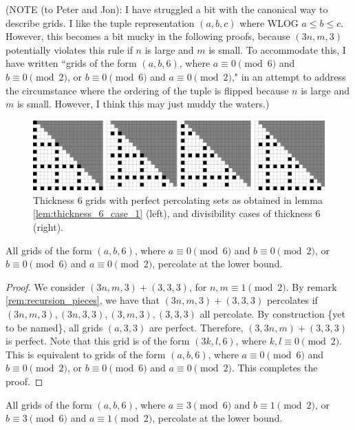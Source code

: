 (NOTE (to Peter and Jon): I have struggled a bit with the canonical way to describe grids. I like the tuple representation $(a,b,c)$ where WLOG $a \leq b \leq c$. However, this becomes a bit mucky in the following proofs, because $(3n,m,3)$ potentially violates this rule if $n$ is large and $m$ is small. To accommodate this, I have written ``grids of the form $(a,b,6)$, where $a \equiv 0 \pmod 6$ and $b \equiv 0 \pmod 2$, or $b \equiv 0 \pmod 6$ and $a \equiv 0 \pmod 2$," in an attempt to address the circumstance where the ordering of the tuple is flipped because $n$ is large and $m$ is small. However, I think this may just muddy the waters.)

\begin{figure}[]
\centering
\includegraphics[width=\textwidth]{figures/3/thickness_6_case_1.pdf}
\caption{Thickness 6 grids with perfect percolating sets as obtained in lemma \ref{lem:thickness_6_case_1} (left), and divisibility cases of thickness 6 (right).}
\label{fig:thickness_6_case_1}
\end{figure}

\begin{lem}
\label{lem:thickness_6_case_1}
All grids of the form $(a,b,6)$, where $a \equiv 0 \pmod 6$ and $b \equiv 0 \pmod 2$, or $b \equiv 0 \pmod 6$ and $a \equiv 0 \pmod 2$, percolate at the lower bound.
\end{lem}

\begin{proof}
We consider $(3n,m,3) + (3,3,3)$, for $n,m \equiv 1 \pmod 2$. By remark \ref{rem:recursion_pieces}, we have that $(3n,m,3) + (3,3,3)$ percolates if $(3n,m,3), (3n,3,3), (3,m,3),(3,3,3)$ all percolate. By construction \{yet to be named\}, all grids $(a,3,3)$ are perfect. Therefore, $(3,3n,m) + (3,3,3)$ is perfect. Note that this grid is of the form $(3k, l, 6)$, where $k,l \equiv 0 \pmod 2$. This is equivalent to grids of the form $(a,b,6)$, where $a \equiv 0 \pmod 6$ and $b \equiv 0 \pmod 2$, or $b \equiv 0 \pmod 6$ and $a \equiv 0 \pmod 2$. This completes the proof.
\end{proof}

\begin{lem}
\label{lem:thickness_6_case_2}
All grids of the form $(a,b,6)$, where $a \equiv 3 \pmod 6$ and $b \equiv 1 \pmod 2$, or $b \equiv 3 \pmod 6$ and $a \equiv 1 \pmod 2$, percolate at the lower bound.
\end{lem}

